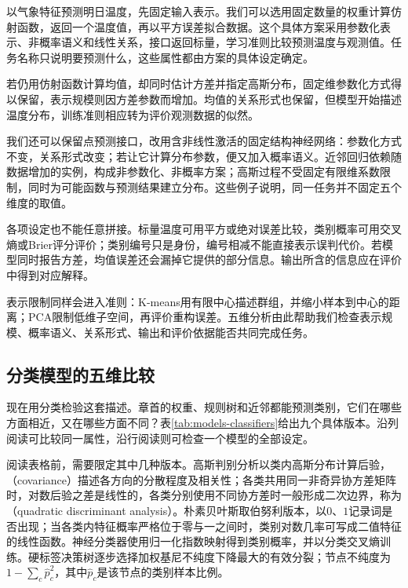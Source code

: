 以气象特征预测明日温度，先固定输入表示。我们可以选用固定数量的权重计算仿射函数，返回一个温度值，再以平方误差拟合数据。这个具体方案采用参数化表示、非概率语义和线性关系，接口返回标量，学习准则比较预测温度与观测值。任务名称只说明要预测什么，这些属性都由方案的具体设定确定。

若仍用仿射函数计算均值，却同时估计方差并指定高斯分布，固定维参数化方式得以保留，表示规模则因方差参数而增加。均值的关系形式也保留，但模型开始描述温度分布，训练准则相应转为评价观测数据的似然。

我们还可以保留点预测接口，改用含非线性激活的固定结构神经网络：参数化方式不变，关系形式改变；若让它计算分布参数，便又加入概率语义。近邻回归依赖随数据增加的实例，构成非参数化、非概率方案；高斯过程不受固定有限维系数限制，同时为可能函数与预测结果建立分布。这些例子说明，同一任务并不固定五个维度的取值。

各项设定也不能任意拼接。标量温度可用平方或绝对误差比较，类别概率可用交叉熵或Brier评分评价；类别编号只是身份，编号相减不能直接表示误判代价。若模型同时报告方差，均值误差还会漏掉它提供的部分信息。输出所含的信息应在评价中得到对应解释。

表示限制同样会进入准则：K-means用有限中心描述群组，并缩小样本到中心的距离；PCA限制低维子空间，再评价重构误差。五维分析由此帮助我们检查表示规模、概率语义、关系形式、输出和评价依据能否共同完成任务。

\subsection{分类模型的五维比较}
\label{sec:models-classification-grid}

现在用分类检验这套描述。章首的权重、规则树和近邻都能预测类别，它们在哪些方面相近，又在哪些方面不同？表\ref{tab:models-classifiers}给出九个具体版本。沿列阅读可比较同一属性，沿行阅读则可检查一个模型的全部设定。

阅读表格前，需要限定其中几种版本。高斯判别分析以类内高斯分布计算后验，（covariance）描述各方向的分散程度及相关性；各类共用同一非奇异协方差矩阵时，对数后验之差是线性的，各类分别使用不同协方差时一般形成二次边界，称为（quadratic discriminant analysis）。朴素贝叶斯取伯努利版本，以$0$、$1$记录词是否出现；当各类内特征概率严格位于零与一之间时，类别对数几率可写成二值特征的线性函数。神经分类器使用归一化指数映射得到类别概率，并以分类交叉熵训练。硬标签决策树逐步选择加权基尼不纯度下降最大的有效分裂；节点不纯度为$1-\sum_c\hat p_c^2$，其中$\hat p_c$是该节点的类别样本比例。

